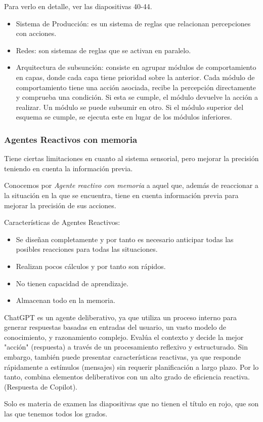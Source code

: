 Para verlo en detalle, ver las diapositivas 40-44.

\begin{itemize}
    \item Sistema de Producción: es un sistema de reglas que relacionan percepciones con acciones.
    \item Redes: son sistemas de reglas que se activan en paralelo.
    \item Arquitectura de subsunción: consiste en agrupar módulos de comportamiento en capas, donde cada capa tiene prioridad sobre la anterior. Cada módulo de comportamiento tiene una
    acción asociada, recibe la percepción
    directamente y comprueba una condición. Si esta
    se cumple, el módulo devuelve la acción a
    realizar.
    Un módulo se puede subsumir en otro. Si el
    módulo superior del esquema se cumple, se
    ejecuta este en lugar de los módulos inferiores.
\end{itemize}

\subsubsection{Agentes Reactivos con memoria}

Tiene ciertas limitaciones en cuanto al sistema sensorial, pero mejorar la precisión teniendo en cuenta la información previa.

Conocemos por \textit{Agente reactivo con memoria} a aquel que, además de reaccionar a la situación en la que se encuentra, tiene en cuenta información previa para mejorar la precisión de sus acciones.

Características de Agentes Reactivos:

\begin{itemize}
    \item Se diseñan completamente y por tanto es necesario anticipar todas
    las posibles reacciones para todas las situaciones.
    \item Realizan pocos cálculos y por tanto son rápidos.
    \item No tienen capacidad de aprendizaje.
    \item Almacenan todo en la memoria.
\end{itemize}

\begin{tcolorbox}[colback=yellow!10!white, colframe=yellow!90!black, title=¿Qué tipo de agente es ChatGPT?]
ChatGPT es un agente deliberativo, ya que utiliza un
proceso interno para generar respuestas basadas en
entradas del usuario, un vasto modelo de
conocimiento, y razonamiento complejo. Evalúa el
contexto y decide la mejor "acción" (respuesta) a
través de un procesamiento reflexivo y estructurado.
Sin embargo, también puede presentar características
reactivas, ya que responde rápidamente a estímulos
(mensajes) sin requerir planificación a largo plazo. Por
lo tanto, combina elementos deliberativos con un alto
grado de eficiencia reactiva. (Respuesta de Copilot).
\end{tcolorbox}

\begin{tcolorbox}[colback=red!10!white, colframe=red!90!black, title=Advertencia]
Solo es materia de examen las diapositivas que no tienen el título en rojo, que son las que tenemos todos los grados.
\end{tcolorbox}